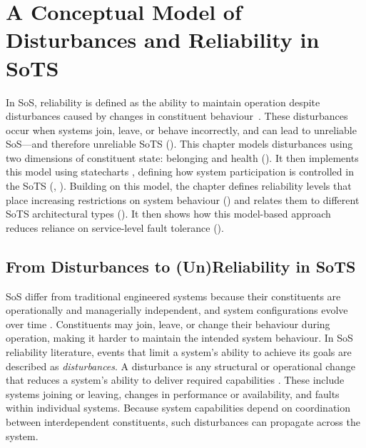 \chapter{A Conceptual Model of Disturbances and Reliability in SoTS}\label{ch:reliable-sots}

In SoS, reliability is defined as the ability to maintain operation despite disturbances caused by changes in constituent behaviour~\cite{ferreira2023towards}. These disturbances occur when systems join, leave, or behave incorrectly, and can lead to unreliable SoS---and therefore unreliable SoTS (). This chapter models disturbances using two dimensions of constituent state: belonging and health (). It then implements this model using statecharts \cite{harel1987statecharts}, defining how system participation is controlled in the SoTS (, ). Building on this model, the chapter defines reliability levels that place increasing restrictions on system behaviour () and relates them to different SoTS architectural types (). It then shows how this model-based approach reduces reliance on service-level fault tolerance ().

\section{From Disturbances to (Un)Reliability in SoTS}\label{sec:disturbances-to-unreliability}
SoS differ from traditional engineered systems because their constituents are operationally and managerially independent, and system configurations evolve over time \cite{maier1998architecting}. Constituents may join, leave, or change their behaviour during operation, making it harder to maintain the intended system behaviour. In SoS reliability literature, events that limit a system's ability to achieve its goals are described as \emph{disturbances}. A disturbance is any structural or operational change that reduces a system's ability to deliver required capabilities \cite{ferreira2023towards}. These include systems joining or leaving, changes in performance or availability, and faults within individual systems. Because system capabilities depend on coordination between interdependent constituents, such disturbances can propagate across the system.

